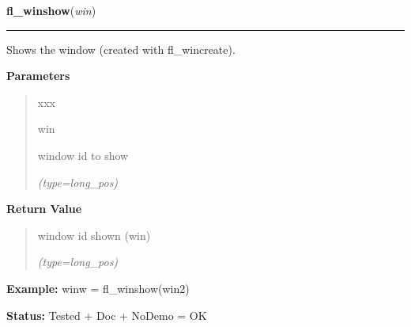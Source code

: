 \hspace{.8\funcindent}\begin{boxedminipage}{\funcwidth}

    \raggedright \textbf{fl\_winshow}(\textit{win})

    \vspace{-1.5ex}

    \rule{\textwidth}{0.5\fboxrule}
\setlength{\parskip}{2ex}
    Shows the window (created with fl\_wincreate).

\setlength{\parskip}{1ex}
      \textbf{Parameters}
      \vspace{-1ex}

      \begin{quote}
        \begin{Ventry}{xxx}

          \item[win]

          window id to show

            {\it (type=long\_pos)}

        \end{Ventry}

      \end{quote}

      \textbf{Return Value}
    \vspace{-1ex}

      \begin{quote}
      window id shown (win)

      {\it (type=long\_pos)}

      \end{quote}

\textbf{Example:} winw = fl\_winshow(win2)



\textbf{Status:} Tested + Doc + NoDemo = OK



    \end{boxedminipage}

    \label{xformslib:flxbasic:fl_winopen}

    \vspace{0.5ex}


